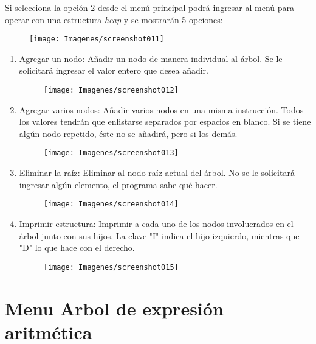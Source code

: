 \documentclass[letterpaper, 11pt]{article}
\begin{document}
	Si selecciona la opción 2 desde el menú principal podrá ingresar al menú para operar con una estructura \textit{heap} y se mostrarán 5 opciones:
	
	\begin{figure}[H]
		\centering
		\texttt{[image: Imagenes/screenshot011]}
	\end{figure}

	\begin{enumerate}
		\item Agregar un nodo: Añadir un nodo de manera individual al 
		árbol. Se le solicitará ingresar el valor entero que desea añadir.
		
		\begin{figure}[H]
			\centering
			\texttt{[image: Imagenes/screenshot012]}
		\end{figure}
		
		\item Agregar varios nodos: Añadir varios nodos en una misma instrucción. Todos los valores tendrán que enlistarse separados por espacios en blanco. Si se tiene algún nodo repetido, éste no se añadirá, pero si los demás.
		
		\begin{figure}[H]
			\centering
			\texttt{[image: Imagenes/screenshot013]}
		\end{figure}
	
		\item Eliminar la raíz: Eliminar al nodo raíz actual del árbol. No se le solicitará ingresar algún elemento, el programa sabe qué hacer. 
		
		\begin{figure}[H]
			\centering
			\texttt{[image: Imagenes/screenshot014]}
		\end{figure}
		
		\item Imprimir estructura: Imprimir a cada uno de los nodos involucrados en el árbol junto con sus hijos. La clave "I" indica el hijo izquierdo, mientras que "D" lo que hace con el derecho.
		
		\begin{figure}[H]
			\centering
			\texttt{[image: Imagenes/screenshot015]}
		\end{figure}
		
	\end{enumerate}
	
	\newpage
	
	\section*{Menu Arbol de expresión aritmética}
	
\end{document}
